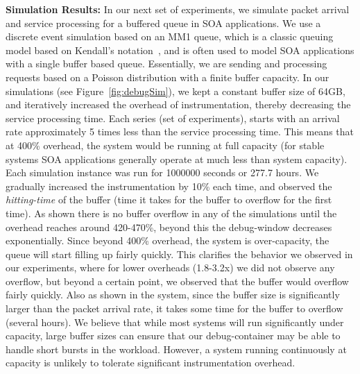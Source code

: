 \noindent
\textbf{Simulation Results:} 
In our next set of experiments, we simulate packet arrival and service processing for a buffered queue in SOA applications. 
We use a discrete event simulation based on an M\/M\/1 queue, which is a  classic queuing model based on Kendall's notation~\cite{kendall}, and is often used to model SOA applications with a single buffer based queue.
Essentially, we are sending and processing requests based on a Poisson distribution with a finite buffer capacity.
In our simulations (see Figure~\ref{fig:debugSim}), we kept a constant buffer size of 64GB, and iteratively increased the overhead of instrumentation, thereby decreasing the service processing time.
Each series (set of experiments), starts with an arrival rate approximately 5 times less than the service processing time. 
This means that at 400\% overhead, the system would be running at full capacity (for stable systems SOA applications generally operate at much less than system capacity).
Each simulation instance was run for 1000000 seconds or 277.7 hours.
We gradually increased the instrumentation by 10\% each time, and observed the \textit{hitting-time} of the buffer (time it takes for the buffer to overflow for the first time).
As shown there is no buffer overflow in any of the simulations until the overhead reaches around 420-470\%, beyond this the debug-window decreases exponentially.
Since beyond 400\% overhead, the system is over-capacity, the queue will start filling up fairly quickly. 
This clarifies the behavior we observed in our experiments, where for lower overheads (1.8-3.2x) we did not observe any overflow, but beyond a certain point, we observed that the buffer would overflow fairly quickly.
Also as shown in the system, since the buffer size is significantly larger than the packet arrival rate, it takes some time for the buffer to overflow (several hours).
We believe that while most systems will run significantly under capacity, large buffer sizes can ensure that our debug-container may be able to handle short bursts in the workload.
However, a system running continuously at capacity is unlikely to tolerate significant instrumentation overhead.\\ \\




